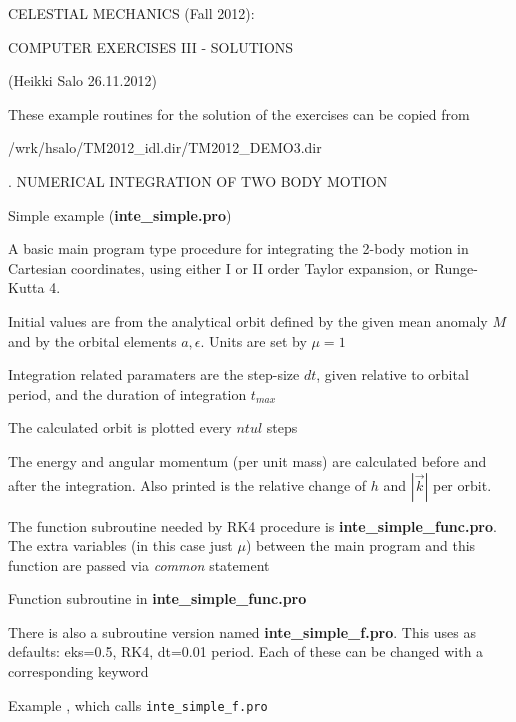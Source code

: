 \documentclass[a4paper,12pt]{article}
\def\red{\color{red}}
\def\black{\color{RGBblack}}
\begin{document}
{\centerline{}




{\norm
\vskip 0cm
{{\centerline { {\isob CELESTIAL MECHANICS (Fall 2012): }}}}
\vskip 0.2cm
{{\centerline { {\isob COMPUTER EXERCISES III - SOLUTIONS}}}}

{{\centerline { { (Heikki Salo 26.11.2012)}}}}

\vskip 2cm


These example routines for the solution of the exercises can be copied from

/wrk/hsalo/TM2012\_idl.dir/TM2012\_DEMO3.dir


\newpage
\black
{. NUMERICAL INTEGRATION OF TWO BODY MOTION}  


\hlin
{ Simple example ({\bf inte\_simple.pro}})



\bul A basic main program type procedure for integrating the 2-body
motion in Cartesian coordinates, using either I or II order Taylor
expansion, or Runge-Kutta 4.

\bul Initial values are from the analytical orbit defined by the given
mean anomaly $M$ and by the orbital elements $a, \epsilon$.  Units are set by
$\mu=1$

\bul Integration related paramaters are the step-size $dt$, given
relative to orbital period, and the duration of integration $t_{max}$

\bul The calculated orbit is plotted every $ntul$ steps
 

\bul The energy  and angular momentum (per unit mass) are calculated
before and after the integration. Also printed is the relative change of $h$ and $|\vec k|$ per
orbit.

\bul The function subroutine needed by RK4 procedure is {\bf inte\_simple\_func.pro}. The extra variables (in this case just $\mu$) between the main program and this function are passed via {\em common} statement


{\scriptsize \red

}
\black

\hlin
Function subroutine in {\bf inte\_simple\_func.pro}
{\scriptsize \red

}\black


\bul There is also a subroutine version named {\bf inte\_simple\_f.pro}. This uses as defaults: eks=0.5, RK4, dt=0.01 period. Each of these can be changed with a corresponding keyword


\newpage

Example , which calls {\tt inte\_simple\_f.pro}

}}
\end{document}
